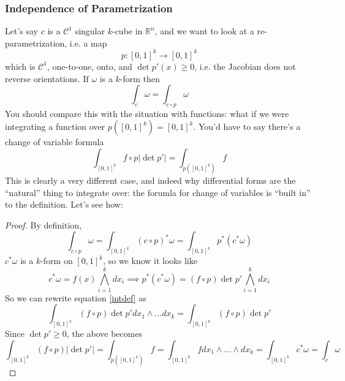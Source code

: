 \documentclass{article}
\newcommand{\reals}[0]{\mathbb{R}}
\newcommand{\mc}[1]{\mathcal{#1}}
\begin{document}
\subsubsection{Independence of Parametrization}

Let's say \(c\) is a \(\mc{C}^1\) singular \(k\)-cube in \(\reals^n\), and we want to look at a re-parametrization, i.e. a map
\begin{equation}
  p : [0, 1]^k \to [0, 1]^k
\end{equation}
which is \(\mc{C}^1\), one-to-one, onto, and \(\det p'(x) \geq 0\), i.e. the Jacobian does not reverse orientations.
If \(\omega\) is a \(k\)-form then
\begin{equation}
  \int_c\omega = \int_{c \circ p}\omega
\end{equation}
You should compare this with the situation with functions: what if we were integrating a function over \(p([0, 1]^k) = [0, 1]^k\). You'd have to say there's a change of variable formula
\begin{equation}
  \int_{[0, 1]^k}f \circ p|\det p'| = \int_{p([0, 1]^k)}f
\end{equation}
This is clearly a very different case, and indeed why differential forms are the ``natural'' thing to integrate over: the forumla for change of variables is ``built in'' to the definition. Let's see how:
\begin{proof}
  By definition,
  \begin{equation}
    \int_{c \circ p}\omega = \int_{[0, 1]^k}(c \circ p)^*\omega = \int_{[0, 1]^k}p^*(c^*\omega)
    \label{intdef}
  \end{equation}
  \(c^*\omega\) is a \(k\)-form on \([0, 1]^k\), so we know it looks like
  \begin{equation}
    c^*\omega = f(x)\bigwedge_{i = 1}^kdx_i \implies p^*(c^*\omega) = (f \circ p)\det p' \bigwedge_{i = 1}^k dx_i
  \end{equation}
  So we can rewrite equation \ref{intdef} as
  \begin{equation}
    \int_{[0, 1]^k}(f \circ p)\det p'dx_1 \wedge ... dx_k = \int_{[0, 1]^k}(f \circ p)\det p'
  \end{equation}
  Since \(\det p' \geq 0\), the above becomes
  \begin{equation}
    \int_{[0, 1]^k}(f \circ p)|\det p'| = \int_{p([0, 1]^k)}f = \int_{[0, 1]^k}fdx_1 \wedge ... \wedge dx_k = \int_{[0, 1]^k}c^*\omega = \int_c\omega
  \end{equation}

\end{proof}
\end{document}
